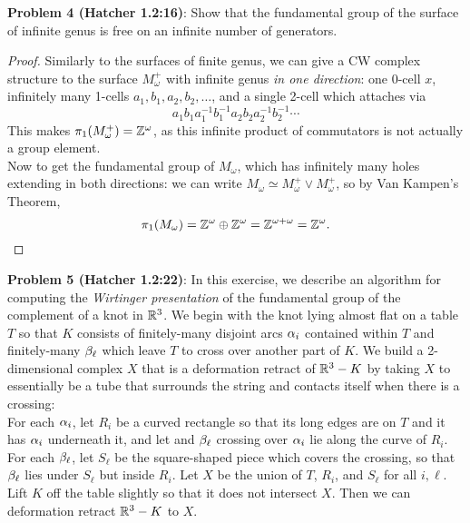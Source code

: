 \documentclass{amsart}
\begin{document}
\newpage 
\textbf{Problem 4 (Hatcher 1.2:16)}: Show that the fundamental group of the surface of infinite genus is free on an infinite number of generators.
\begin{proof}
	Similarly to the surfaces of finite genus, we can give a CW complex structure to the surface $M_{\omega}^+$ with infinite genus \textit{in one direction}: one 0-cell $x$, infinitely many 1-cells $a_1,b_1,a_2,b_2,\dots$, and a single 2-cell which attaches via $$a_1b_1a_1^{-1}b_1^{-1}a_2b_2a_2^{-1}b_2^{-1}\cdots$$
	This makes $\pi_1(M_{\omega}^+)=\mathbb{Z}^{\omega}$, as this infinite product of commutators is not actually a group element.\\
	
	Now to get the fundamental group of $M_{\omega}$, which has infinitely many holes extending in both directions: we can write $M_{\omega}\simeq M_{\omega}^+\vee M_{\omega}^+$, so by Van Kampen's Theorem,
	$$\pi_1(M_{\omega})=\mathbb{Z}^{\omega}\oplus \mathbb{Z}^{\omega} = \mathbb{Z}^{\omega+\omega} = \mathbb{Z}^{\omega}.$$
\end{proof}

\newpage
\textbf{Problem 5 (Hatcher 1.2:22)}: In this exercise, we describe an algorithm for computing the \textit{Wirtinger presentation} of the fundamental group of the complement of a knot in $\mathbb{R}^3$. We begin with the knot lying almost flat on a table $T$ so that $K$ consists of finitely-many disjoint arcs $\alpha_i$ contained within $T$ and finitely-many $\beta_{\ell}$ which leave $T$ to cross over another part of $K$. We build a 2-dimensional complex $X$ that is a deformation retract of $\mathbb{R}^3-K$ by taking $X$ to essentially be a tube that surrounds the string and contacts itself when there is a crossing:\\

For each $\alpha_i$, let $R_i$ be a curved rectangle so that its long edges are on $T$ and it has $\alpha_i$ underneath it, and let and $\beta_{\ell}$ crossing over $\alpha_i$ lie along the curve of $R_i$. For each $\beta_{\ell}$, let $S_{\ell}$ be the square-shaped piece which covers the crossing, so that $\beta_{\ell}$ lies under $S_{\ell}$ but inside $R_i$. Let $X$ be the union of $T$, $R_i$, and $S_{\ell}$ for all $i,\ell$. Lift $K$ off the table slightly so that it does not intersect $X$. Then we can deformation retract $\mathbb{R}^3-K$ to $X$.\\
\end{document}
